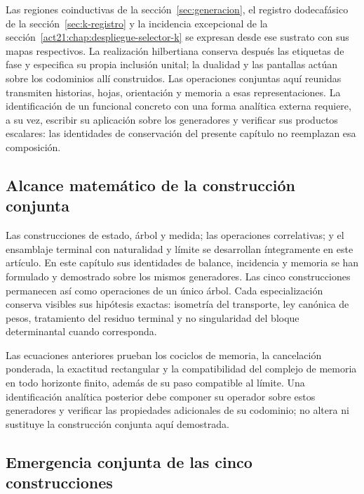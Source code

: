 Las regiones coinductivas de la sección~\ref{sec:generacion}, el registro
dodecafásico de la sección~\ref{sec:k-registro} y la incidencia excepcional
de la sección~\ref{act21:chap:despliegue-selector-k} se expresan desde ese sustrato con sus mapas
respectivos. La realización hilbertiana conserva después las etiquetas de
fase y especifica su propia inclusión unital; la dualidad y las pantallas
actúan sobre los codominios allí construidos. Las operaciones conjuntas aquí
reunidas transmiten historias, hojas, orientación y memoria a esas
representaciones. La identificación de un funcional concreto con una forma
analítica externa requiere, a su vez, escribir su aplicación sobre los
generadores y verificar sus productos escalares: las identidades de
conservación del presente capítulo no reemplazan esa composición.

\subsection{Alcance matemático de la construcción conjunta}
Las construcciones de estado, árbol y medida; las operaciones correlativas; y
el ensamblaje terminal con naturalidad y límite se desarrollan íntegramente
en este artículo. En este capítulo sus identidades de
balance, incidencia y memoria se han formulado y demostrado sobre los mismos
generadores. Las cinco construcciones permanecen así como operaciones de un
único árbol. Cada especialización conserva visibles sus hipótesis exactas:
isometría del transporte, ley canónica de pesos, tratamiento del residuo
terminal y no singularidad del bloque determinantal cuando corresponda.

Las ecuaciones anteriores prueban los cociclos de memoria, la cancelación
ponderada, la exactitud rectangular y la compatibilidad del complejo de
memoria en todo horizonte finito, además de su paso compatible al límite.
Una identificación analítica posterior debe componer su operador sobre estos
generadores y verificar las propiedades adicionales de su codominio; no
altera ni sustituye la construcción conjunta aquí demostrada.

\iffalse
\subsection{Emergencia conjunta de las cinco construcciones}
\label{act21:sec:cinco-construcciones-continuo-ch}

